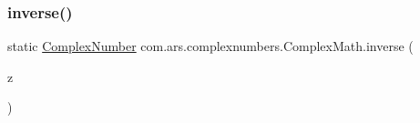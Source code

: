 \hypertarget{classcom_1_1ars_1_1complexnumbers_1_1_complex_math_a06897e69e7c59bf707851f4a502d11b8}{}\label{classcom_1_1ars_1_1complexnumbers_1_1_complex_math_a06897e69e7c59bf707851f4a502d11b8} 
\subsubsection{\texorpdfstring{inverse()}{inverse()}}
{\footnotesize\ttfamily static \hyperlink{classcom_1_1ars_1_1complexnumbers_1_1_complex_number}{Complex\+Number} com.\+ars.\+complexnumbers.\+Complex\+Math.\+inverse (\begin{DoxyParamCaption}\item[{\hyperlink{classcom_1_1ars_1_1complexnumbers_1_1_complex_number}{Complex\+Number}}]{z }\end{DoxyParamCaption})\hspace{0.3cm}{\ttfamily [static]}}

